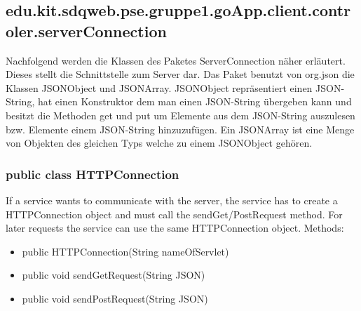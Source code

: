 \hypertarget{ServerConnection}{}
	\subsection{edu.kit.sdqweb.pse.gruppe1.goApp.client.controler.serverConnection}
	 	Nachfolgend werden die Klassen des Paketes ServerConnection näher erläutert.
 	Dieses stellt die Schnittstelle zum Server dar. Das Paket benutzt von org.json die Klassen JSONObject und JSONArray.
 	JSONObject repräsentiert einen JSON-String, hat einen Konstruktor dem man einen JSON-String übergeben kann und besitzt die Methoden get und put um Elemente aus dem JSON-String auszulesen bzw. Elemente einem JSON-String hinzuzufügen. 
 	Ein JSONArray ist eine Menge von Objekten des gleichen Typs welche zu einem JSONObject gehören.
 	
	\subsubsection{public class HTTPConnection}
If a service wants to communicate with the server, the service has to create a HTTPConnection object and must call the sendGet/PostRequest method.
For later requests the service can use the same HTTPConnection object.
\newline Methods:
\begin{itemize}
	\item public HTTPConnection(String nameOfServlet)
		
		\item public void sendGetRequest(String JSON)
		
		\item public void sendPostRequest(String JSON)
	\end{itemize}
	
